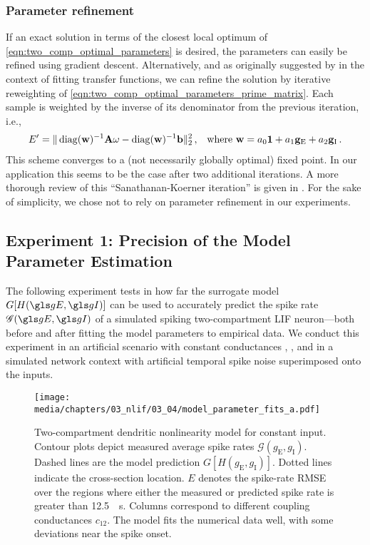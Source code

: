 \subsubsection{Parameter refinement}
If an exact solution in terms of the closest local optimum of \cref{eqn:two_comp_optimal_parameters} is desired, the parameters can easily be refined using gradient descent.
Alternatively, and as originally suggested by \citet{sanathanan1963transfer} in the context of fitting transfer functions, we can refine the solution by iterative reweighting of \cref{eqn:two_comp_optimal_parameters_prime_matrix}.
Each sample is weighted by the inverse of its denominator from the previous iteration, i.e.,
\begin{align}
	E' &= \|\operatorname{\mathrm{diag}}(\mathbf{w})^{-1} \mathbf{A} \mathbf{\omega} - \operatorname{\mathrm{diag}}(\mathbf{w})^{-1}\mathbf{b} \|_2^2 \,, & \text{where } \mathbf{w} = a_0 \mathbf{1} + a_1 \mathbf{g}_\mathrm{E} + a_2 \mathbf{g}_\mathrm{I} \,.
	\label{eqn:sanathanan_koerner}
\end{align}
This scheme converges to a (not necessarily globally optimal) fixed point.
In our application this seems to be the case after two additional iterations.
A more thorough review of this \enquote{Sanathanan-Koerner iteration} is given in \citet[Section~2.2]{hokanson2018least}.
For the sake of simplicity, we chose not to rely on parameter refinement in our experiments.

\subsection{Experiment 1: Precision of the Model Parameter Estimation}
\label{sec:two_comp_lif_experiment_1}

The following experiment tests in how far the surrogate model $G[H(\gE, \gI)]$ can be used to accurately predict the spike rate $\mathscr{G}(\gE, \gI)$ of a simulated spiking two-com\-part\-ment LIF neuron---both before and after fitting the model parameters to empirical data.
We conduct this experiment in an artificial scenario with constant conductances \gE, \gI, and in a simulated network context with artificial temporal spike noise superimposed onto the inputs.

\begin{figure}[t]
	\texttt{[image: media/chapters/03\_nlif/03\_04/model\_parameter\_fits\_a.pdf]}%
	{\label{fig:synaptic_nonlinearity_fit_a_a}}%
	{\label{fig:synaptic_nonlinearity_fit_a_b}}%
	\caption[Two-compartment dendritic nonlinearity model for constant input]{
		Two-compartment dendritic nonlinearity model for constant input. Contour plots depict measured average spike rates $\mathscr{G}(g_\mathrm{E}, g_\mathrm{I})$.
		Dashed lines are the model prediction $G[H(g_\mathrm{E}, g_\mathrm{I})]$. Dotted lines indicate the cross-section location.
		$E$ denotes the spike-rate RMSE over the regions where either the measured or predicted spike rate is greater than \SI{12.5}{\per\second}.
		Columns correspond to different coupling conductances $c_\mathrm{12}$.
		The model fits the numerical data well, with some deviations near the spike onset.}
	\label{fig:synaptic_nonlinearity_fit_a}%
\end{figure}

